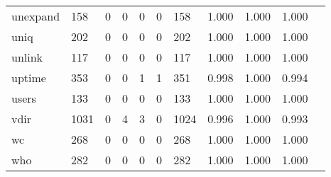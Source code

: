 \begin{longtable}{lp{1.10cm}p{1.10cm}p{1.10cm}p{1.10cm}p{1.10cm}p{1.10cm}p{1.10cm}p{1.10cm}p{1.10cm}p{1.10cm}}
unexpand  &                    158 &                                  0 &                                 0 &                                0 &                                 0 &                             158 &                             1.000 &                                 1.000 &                               1.000 \\
uniq      &                    202 &                                  0 &                                 0 &                                0 &                                 0 &                             202 &                             1.000 &                                 1.000 &                               1.000 \\
unlink    &                    117 &                                  0 &                                 0 &                                0 &                                 0 &                             117 &                             1.000 &                                 1.000 &                               1.000 \\
uptime    &                    353 &                                  0 &                                 0 &                                1 &                                 1 &                             351 &                             0.998 &                                 1.000 &                               0.994 \\
users     &                    133 &                                  0 &                                 0 &                                0 &                                 0 &                             133 &                             1.000 &                                 1.000 &                               1.000 \\
vdir      &                   1031 &                                  0 &                                 4 &                                3 &                                 0 &                            1024 &                             0.996 &                                 1.000 &                               0.993 \\
wc        &                    268 &                                  0 &                                 0 &                                0 &                                 0 &                             268 &                             1.000 &                                 1.000 &                               1.000 \\
who       &                    282 &                                  0 &                                 0 &                                0 &                                 0 &                             282 &                             1.000 &                                 1.000 &                               1.000 \\

\end{longtable}

